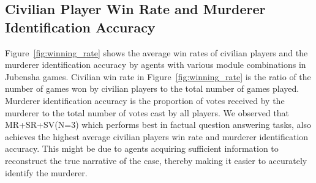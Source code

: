 \documentclass[11pt]{article}
\begin{document}
\subsection{Civilian Player Win Rate and Murderer Identification Accuracy}

Figure~\ref{fig:winning_rate} shows the average win rates of civilian players and the murderer identification accuracy by agents with various module combinations in Jubensha games. Civilian win rate in Figure~\ref{fig:winning_rate} is the ratio of the number of games won by civilian players to the total number of games played. Murderer identification accuracy is the proportion of votes received by the murderer to the total number of votes cast by all players. We observed that MR+SR+SV(N=3) which performs best in factual question answering tasks, also achieves the highest average civilian players win rate and murderer identification accuracy. This might be due to agents acquiring sufficient information to reconstruct the true narrative of the case, thereby making it easier to accurately identify the murderer. 









\end{document}
